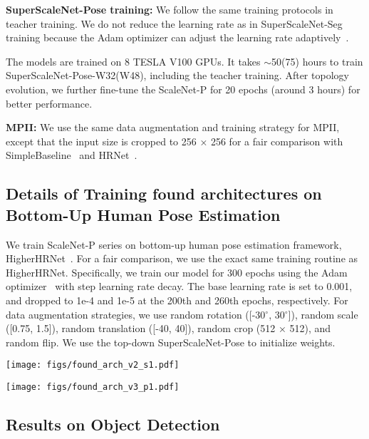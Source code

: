\documentclass[final]{cvpr}
\newcommand{\netname}{ScaleNet\xspace}
\newcommand{\supernet}{SuperScaleNet\xspace}
\begin{document}
\textbf{SuperScaleNet-Pose training:} We follow the same training protocols in teacher training. We do not reduce the learning rate as in SuperScaleNet-Seg training because the Adam optimizer can adjust the learning rate adaptively~\cite{kingma2014adam}. 

The models are trained on 8 TESLA V100 GPUs. It takes $\sim$50(75) hours to train \supernet-Pose-W32(W48), including the teacher training. After topology evolution, we further fine-tune the \netname-P for 20 epochs (around 3 hours) for better performance.

\textbf{MPII:} We use the same data augmentation and training strategy for MPII, except that the input size is cropped to 256 × 256 for a fair comparison with SimpleBaseline~\cite{xiao2018simple} and HRNet~\cite{sun2019deep}.

\subsection{Details of Training found architectures on Bottom-Up Human Pose Estimation}
We train \netname-P series on bottom-up human pose estimation framework, HigherHRNet~\cite{cheng2020higherhrnet}. For a fair comparison, we use the exact same training routine as HigherHRNet. Specifically, we train our model for 300 epochs using the Adam optimizer~\cite{kingma2014adam} with step learning rate decay. The base learning rate is set to 0.001, and dropped to 1e-4 and 1e-5 at the 200th and 260th epochs, respectively. For data augmentation strategies, we use random rotation ([-30$^{\circ}$, 30$^{\circ}$]), random scale ([0.75, 1.5]), random translation ([-40, 40]), random crop (512 × 512), and random flip. We use the top-down SuperScaleNet-Pose to initialize weights.

\begin{figure*}
    \centering
    \texttt{[image: figs/found\_arch\_v2\_s1.pdf]}
    \caption{The full model of \netname-S1.}
    \label{fig:full_s1}
\end{figure*}
\begin{figure*}
    \centering
    \texttt{[image: figs/found\_arch\_v3\_p1.pdf]}
    \caption{The full model of \netname-P1.}
    \label{fig:full_p1}
\end{figure*}

\subsection{Results on Object Detection}
\end{document}
